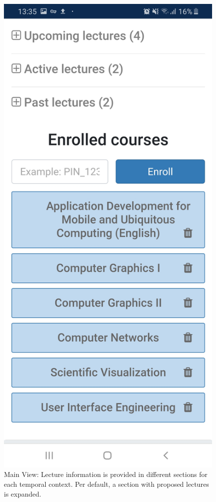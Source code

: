\begin{figure}
\begin{minipage}[t]{.5\textwidth}
		\captionsetup{width=.9\linewidth}
		\captionsetup{format=plain}
		\caption{Main View: Lecture information is provided in different sections for each temporal context. Per default, a section with proposed lectures is expanded.}
		\label{fig:mainview}
	\end{minipage}%
	\begin{minipage}[t]{.5\textwidth}
		\centering
		\includegraphics[width=0.95\linewidth]{screenshots/main_view_course_management.jpg}

\end{minipage}
\end{figure}
